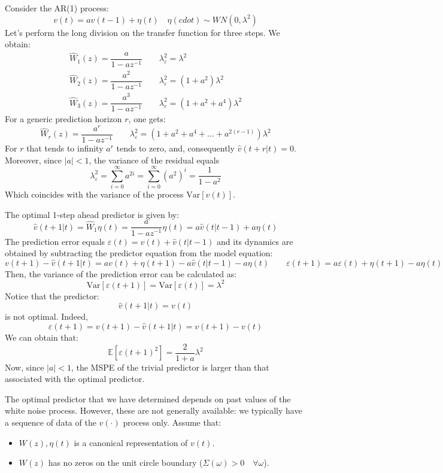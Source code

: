 \begin{example}
    Consider the AR(1) process: 
    \[v(t)=av(t-1)+\eta(t)\quad \eta(cdot)\sim WN(0,\lambda^2)\]
    Let's perform the long division on the transfer function for three steps. 
    We obtain: 
    \begin{align*}
        \hat{W}_1(z)=\dfrac{a}{1-az^{-1}} \qquad \lambda_\varepsilon^2=\lambda^2 \\
        \hat{W}_2(z)=\dfrac{a^2}{1-az^{-1}} \qquad \lambda_\varepsilon^2=(1+a^2)\lambda^2 \\ 
        \hat{W}_3(z)=\dfrac{a^3}{1-az^{-1}} \qquad \lambda_\varepsilon^2=(1+a^2+a^4)\lambda^2
    \end{align*}
    For a generic prediction horizon $r$, one gets: 
    \[\hat{W}_r(z)=\dfrac{a^r}{1-az^{-1}} \qquad \lambda_\varepsilon^2=(1+a^2+a^4+\dots+a^{2(r-1)})\lambda^2\]
    For $r$ that tends to infinity $a^r$ tends to zero, and, consequently $\hat{v}(t+r|t)=0$. 
    Moreover, since $\left\lvert a\right\rvert  < 1$, the variance of the residual equals 
    \[\lambda_{\varepsilon}^2=\sum_{i=0}^\infty a^{2i}=\sum_{i=0}^\infty (a^2)^{i}=\dfrac{1}{1-a^2}\]
    Which coincides with the variance of the process $\text{Var}\left[v(t)\right]$. 

    The optimal 1-step ahead predictor is given by:
    \[\hat{v}(t+1|t)=\hat{W}_1\eta(t)=\dfrac{a}{1-az^{-1}}\eta(t)=a\hat{v}(t|t-1)+a\eta(t)\]
    The prediction error equals $\varepsilon(t) = v(t) +\hat{v}(t|t-1)$ and its dynamics are obtained by subtracting the predictor equation from the model equation:
    \[v(t+1)- \hat{v}(t+1|t) = av(t) + \eta(t+1) - a\hat{v}(t|t-1) - a\eta(t) \qquad \varepsilon(t+1) = a\varepsilon(t) + \eta(t+1) - a\eta(t) \]
    Then, the variance of the prediction error can be calculated as: 
    \[\text{Var}\left[\varepsilon(t+1)\right]=\text{Var}\left[\varepsilon(t)\right]=\lambda^2\]
    Notice that the predictor:
    \[\hat{v}(t+1|t)=v(t)\]
    is not optimal. 
    Indeed, 
    \[\varepsilon(t+1)=v(t+1)-\hat{v}(t+1|t)=v(t+1)-v(t)\]
    We can obtain that: 
    \[\mathbb{E}\left[ \varepsilon(t+1)^2 \right]=\dfrac{2}{1+a}\lambda^2\]
    Now, since $\left\lvert a\right\rvert  < 1$, the MSPE of the trivial predictor is larger than that associated with the optimal predictor. 
\end{example}
The optimal predictor that we have determined depends on past values of the white noise process.
However, these are not generally available: we typically have a sequence of data of the $v(\cdot)$ process only. 
Assume that:
\begin{itemize}
    \item $W(z),\eta(t)$ is a canonical representation of $v(t)$. 
    \item $W(z)$ has no zeros on the unit circle boundary ($\Sigma(\omega)>0 \quad \forall\omega$). 
\end{itemize}
